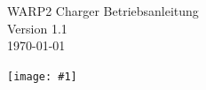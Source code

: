 \documentclass[a4paper,10pt]{article}
\title{}
\author{}
\newcommand{\gfx}[1]{\texttt{[image: \#1]}}
\begin{document}
\pagestyle{empty}
\begin{titlepage}
	\vspace*{-3.08cm}
	\colorbox{boxgray}{}
	\vfill
	\begin{center}
		\Huge
		WARP2 Charger Betriebsanleitung\\\vspace{1cm}
		\large
		Version 1.1\\\vspace{0.25cm}
		\today
	\end{center}
	\vfill \gfx{./img_warp2/resized/warp_perspective_blue_ready}
\end{titlepage}
\newpage
\null
\newpage
\pagestyle{fancy}
\end{document}
